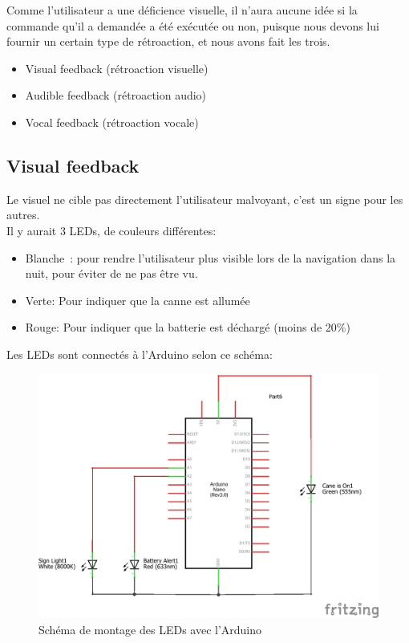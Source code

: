 Comme l’utilisateur a une déficience visuelle, il n’aura aucune idée si la commande qu’il a demandée a été exécutée ou non, puisque nous devons lui fournir un certain type de rétroaction, et nous avons fait les trois.
\begin{itemize}
    \item Visual feedback (rétroaction visuelle)
    \item Audible feedback (rétroaction audio)
    \item Vocal feedback (rétroaction vocale)
\end{itemize}

\subsection{Visual feedback}
Le visuel ne cible pas directement l’utilisateur malvoyant, c’est un signe pour les autres. \\
Il y aurait 3 \acrshort{LED}s, de couleurs différentes:
\begin{itemize}
    \item Blanche : pour rendre l’utilisateur plus visible lors de la navigation dans la nuit, pour éviter de ne pas être vu.
    \item Verte: Pour indiquer que la canne est allumée
    \item Rouge: Pour indiquer que la batterie est déchargé (moins de 20\%)
\end{itemize}

Les \acrshort{LED}s sont connectés à l'Arduino selon ce schéma:

\begin{figure}[!htbp]
    \centering
    \includegraphics[width=\linewidth]{assets/leds circuit.png}
    \caption{Schéma de montage des \acrshort{LED}s avec l'Arduino}
\end{figure}

